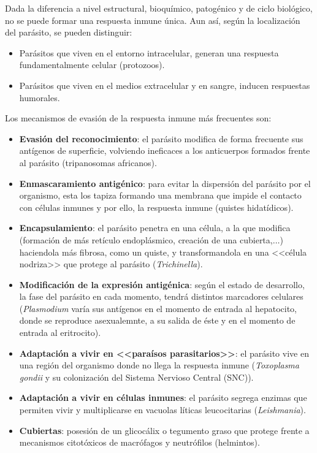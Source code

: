 \documentclass[10pt,a4paper,onecolumn,openany]{book}
\begin{document}
Dada la diferencia a nivel estructural, bioquímico, patogénico y de ciclo biológico, no se puede formar una respuesta inmune única. Aun así, según la localización del parásito, se pueden distinguir:
\begin{itemize}[itemsep=0pt,parsep=0pt,topsep=0pt,partopsep=0pt]
	\item Parásitos que viven en el entorno intracelular, generan una respuesta fundamentalmente celular (protozoos).
	\item Parásitos que viven en el medios extracelular y en sangre, inducen respuestas humorales.
\end{itemize}

Los mecanismos de evasión de la respuesta inmune más frecuentes son:
\begin{itemize}[itemsep=0pt,parsep=0pt,topsep=0pt,partopsep=0pt]
	\item \textbf{Evasión del reconocimiento}: el parásito modifica de forma frecuente sus antígenos de superficie, volviendo ineficaces a los anticuerpos formados frente al parásito (tripanosomas africanos).
	\item\textbf{Enmascaramiento antigénico}: para evitar la dispersión del parásito por el organismo, esta los tapiza formando una membrana que impide el contacto con células inmunes y por ello, la respuesta inmune (quistes hidatídicos).
	\item\textbf{Encapsulamiento}: el parásito penetra en una célula, a la que modifica (formación de más retículo endoplásmico, creación de una cubierta,$\dots$) haciendola más fibrosa, como un quiste, y transformandola en una <<célula nodriza>> que protege al parásito (\textit{Trichinella}).
	\item\textbf{Modificación de la expresión antigénica}: según el estado de desarrollo, la fase del parásito en cada momento, tendrá distintos marcadores celulares (\textit{Plasmodium} varía sus antígenos en el momento de entrada al hepatocito, donde se reproduce asexualemnte, a su salida de éste y en el momento de entrada al eritrocito).
	\item\textbf{Adaptación a vivir en <<paraísos parasitarios>>}: el parásito vive en una región del organismo donde no llega la respuesta inmune (\textit{Toxoplasma gondii} y su colonización del Sistema Nervioso Central (SNC)).
	\item\textbf{Adaptación a vivir en células inmunes}: el parásito segrega enzimas que permiten vivir y multiplicarse en vacuolas líticas leucocitarias (\textit{Leishmania}).
	\item\textbf{Cubiertas}: posesión de un glicocálix o tegumento graso que protege frente a mecanismos citotóxicos de macrófagos y neutrófilos (helmintos).
\end{itemize}
\end{document}
